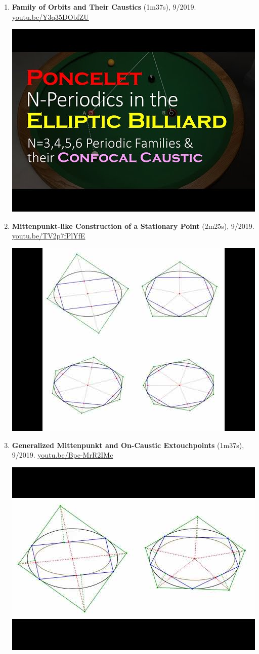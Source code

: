 \documentclass[12pt]{article}
\begin{document}
\begin{enumerate}[resume]
% 
\item \textbf{Family of Orbits and Their Caustics} (1m37s), 9/2019. \href{https://youtu.be/Y3q35DObfZU}{\url{youtu.be/Y3q35DObfZU}}
\begin{center}\includegraphics[width=.5\textwidth]{pics/Y3q35DObfZU.jpg}\end{center}
% 
\item \textbf{Mittenpunkt-like Construction of a Stationary Point} (2m25s), 9/2019. \href{https://youtu.be/TV2p7fPlYfE}{\url{youtu.be/TV2p7fPlYfE}}
\begin{center}\includegraphics[width=.5\textwidth]{pics/TV2p7fPlYfE.jpg}\end{center}
% 
\item \textbf{Generalized Mittenpunkt and On-Caustic Extouchpoints} (1m37s), 9/2019. \href{https://youtu.be/Bpc-MrR2IMc}{\url{youtu.be/Bpc-MrR2IMc}}
\begin{center}\includegraphics[width=.5\textwidth]{pics/Bpc-MrR2IMc.jpg}\end{center}

\end{enumerate}
\end{document}
